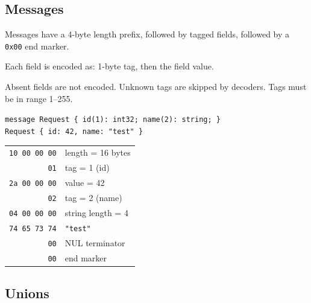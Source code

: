 \documentclass[11pt,onecolumn]{article}
\begin{document}
\subsection{Messages}

\begin{minipage}{\textwidth}
\begin{minipage}[t]{0.44\textwidth}
Messages have a 4-byte length prefix, followed by tagged fields, followed by a \texttt{0x00} end marker.

\vspace{6pt}
Each field is encoded as: 1-byte tag, then the field value.

\vspace{6pt}
Absent fields are not encoded. Unknown tags are skipped by decoders. Tags must be in range 1--255.
\end{minipage}\hfill
\begin{minipage}[t]{0.52\textwidth}
\small\raggedright
\texttt{message Request \{ id(1): int32; name(2): string; \}}\\
\texttt{Request \{ id: 42, name: "test" \}}
\vspace{4pt}

\begin{tabular}[t]{@{}r@{\quad}l@{}}
\texttt{10 00 00 00} & length = 16 bytes \\
\texttt{01} & tag = 1 (id) \\
\texttt{2a 00 00 00} & value = 42 \\
\texttt{02} & tag = 2 (name) \\
\texttt{04 00 00 00} & string length = 4 \\
\texttt{74 65 73 74} & \texttt{"test"} \\
\texttt{00} & NUL terminator \\
\texttt{00} & end marker \\
\end{tabular}
\end{minipage}
\end{minipage}


\subsection{Unions}
\end{document}
